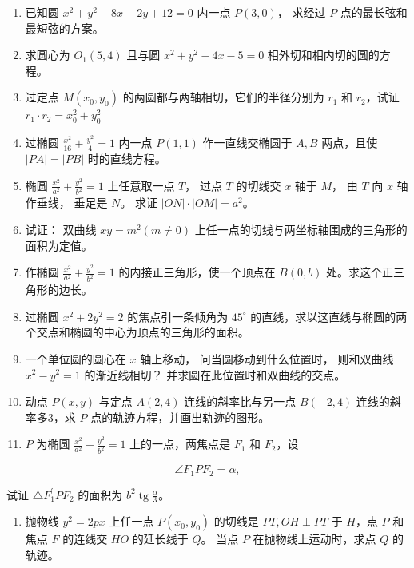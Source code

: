 \begin{enumerate}
\def\labelenumi{\arabic{enumi}.}
\item
  已知圆 \(x^{2} + y^{2} - 8x - 2y + 12 = 0\) 内一点 \(P(3,0)\)， 求经过
  \(P\) 点的最长弦和最短弦的方案。
\item
  求圆心为 \(O_{1}(5,4)\) 且与圆 \(x^{2} + y^{2} - 4x - 5 = 0\)
  相外切和相内切的圆的方程。
\item
  过定点 \(M(x_0, y_0)\) 的两圆都与两轴相切，它们的半径分别为 \(r_1\) 和
  \(r_{2}\)，试证 \(r_{1}\cdot r_{2}=x_{0}^{2}+y_{0}^{2}\)
\item
  过椭圆 \(\frac{x^2}{16} + \frac{y^2}{4} = 1\) 内一点 \(P(1,1)\)
  作一直线交椭圆于 \(A, B\) 两点，且使 \(|PA| = |PB|\) 时的直线方程。
\item
  椭圆 \(\frac{x^2}{a^2} + \frac{y^2}{b^2} = 1\) 上任意取一点 \(T\)，
  过点 \(T\) 的切线交 \(x\) 轴于 \(M\)， 由 \(T\) 向 \(x\) 轴作垂线，
  垂足是 \(N\)。 求证 \(|ON| \cdot |OM| = a^2\)。
\item
  试证： 双曲线 \(xy = m^2 (m \neq 0)\)
  上任一点的切线与两坐标轴围成的三角形的面积为定值。
\item
  作椭圆 \(\frac{x^2}{a^2} + \frac{y^2}{b^2} = 1\)
  的内接正三角形，使一个顶点在 \(B(0, b)\) 处。求这个正三角形的边长。
\item
  过椭圆 \(x^{2} + 2y^{2} = 2\) 的焦点引一条倾角为 \(45^{\circ}\)
  的直线，求以这直线与椭圆的两个交点和椭圆的中心为顶点的三角形的面积。
\item
  一个单位圆的圆心在 \(x\) 轴上移动， 问当圆移动到什么位置时，
  则和双曲线 \(x^{2} - y^{2} = 1\) 的渐近线相切？
  并求圆在此位置时和双曲线的交点。
\item
  动点 \(P(x, y)\) 与定点 \(A(2, 4)\) 连线的斜率比与另一点 \(B(-2, 4)\)
  连线的斜率多3，求 \(P\) 点的轨迹方程，并画出轨迹的图形。
\item
  \(P\) 为椭圆 \(\frac{x^2}{a^2} + \frac{y^2}{b^2} = 1\)
  上的一点，两焦点是 \(F_1\) 和 \(F_2\)，设
\end{enumerate}

\[
\angle F_{1} PF_{2} = \alpha,
\]

试证 \(\triangle F_{1}^{\prime}PF_{2}\) 的面积为
\(b^{2}\operatorname{tg}\frac{\alpha}{3}\)。

\begin{enumerate}
\def\labelenumi{\arabic{enumi}.}
\setcounter{enumi}{11}
\tightlist
\item
  抛物线 \(y^{2} = 2px\) 上任一点 \(P(x_0, y_0)\) 的切线是
  \(PT, OH \perp PT\) 于 \(H\)，点 \(P\) 和焦点 \(F\) 的连线交 \(HO\)
  的延长线于 \(Q\)。 当点 \(P\) 在抛物线上运动时，求点 \(Q\) 的轨迹。
\end{enumerate}

